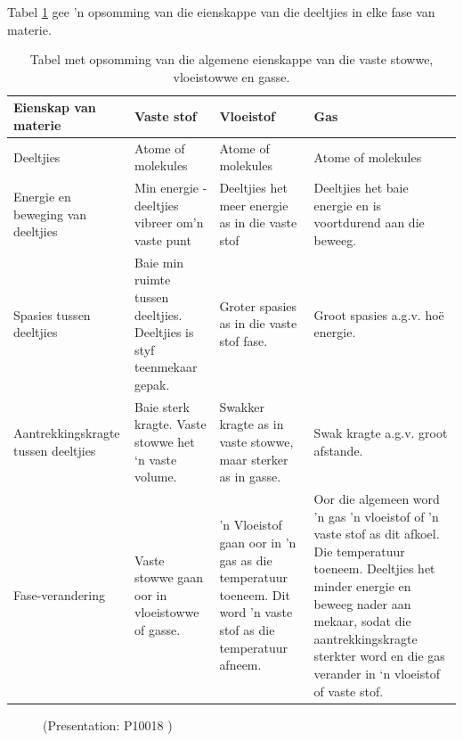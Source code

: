       \label{m38730*id308767}Tabel \ref{tab:microscopic:kinetic theory} gee 'n opsomming van die eienskappe van die deeltjies in elke fase van materie.\par 
\begin{table}[h]
\begin{center}
\caption{Tabel met opsomming van die algemene eienskappe van die vaste stowwe, vloeistowwe en gasse.}
\label{tab:microscopic:kinetic theory}
\begin{tabular}{|p{3cm}|p{3cm}|p{3cm}|p{3cm}|}\hline
\textbf{Eienskap van materie} & \textbf{Vaste stof} & \textbf{Vloeistof} & \textbf{Gas} \\\hline
Deeltjies & Atome of molekules & Atome of molekules & Atome of molekules \\\hline
Energie en beweging van deeltjies & Min energie - deeltjies vibreer om'n vaste punt & Deeltjies het meer energie as in die vaste stof & Deeltjies het baie energie en is voortdurend aan die beweeg.  \\\hline
Spasies tussen  deeltjies & Baie min ruimte tussen deeltjies. Deeltjies is styf teenmekaar gepak. & Groter spasies as in die vaste stof fase. & Groot spasies a.g.v. ho\"{e} energie.  \\\hline
Aantrekkingskragte tussen deeltjies & Baie sterk kragte. Vaste stowwe het ‘n vaste volume. & Swakker kragte as in vaste stowwe, maar sterker as in gasse. & Swak kragte a.g.v. groot afstande. \\\hline
Fase-verandering & Vaste stowwe gaan oor in vloeistowwe of gasse. & 'n Vloeistof gaan oor in 'n gas as die temperatuur toeneem. Dit word 'n vaste stof as die temperatuur afneem. & Oor die algemeen word 'n gas 'n vloeistof of 'n vaste stof as dit afkoel. Die temperatuur toeneem. Deeltjies het minder energie en beweeg nader aan mekaar, sodat die aantrekkingskragte sterkter word en die gas verander in ‘n vloeistof of vaste stof.  \\\hline
\end{tabular}
\end{center}
\end{table}
    \par
    \setcounter{subfigure}{0}
	\begin{figure}[H] %
    \label{m38730*slidesharemedia}\label{m38730*slideshareflash} { (Presentation:  P10018 )}
      \vspace{2pt}
    \vspace{.1in}
 \end{figure}       \par 
